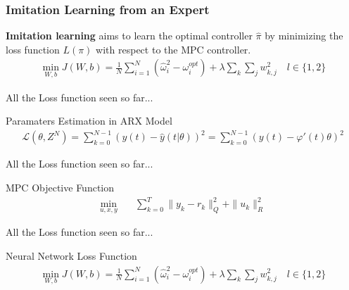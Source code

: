 \documentclass[aspectratio=169,hyperref={pdfpagelabels=false}]{beamer}
\begin{document}
          \begin{frame}
            \frametitle{Imitation Learning from an Expert}
            \begin{block}{}
              \textbf{Imitation learning} aims to learn the optimal controller ${\hat{\pi}}$ by minimizing the loss function $L(\pi)$ with respect to the MPC controller. 
              \begin{align*}
                \min_{W,b} J(W, b) = \frac{1}{N} \sum_{i=1}^{N} (\hat{\omega}_{i}^2 -\omega_{i}^{opt}) + \lambda \sum_{k} \sum_{j} w_{k,j}^2 \quad l \in \{1, 2\}
              \end{align*}
            \end{block}
            \let\thefootnote\relax{}
            \end{frame}

          \begin{frame}{All the Loss function seen so far...}
            \begin{block}{Paramaters Estimation in ARX Model}
              \begin{align*}
                \mathcal{L}(\theta, Z^N) = \sum_{k=0}^{N-1}(y(t)-\hat{y}(t|\theta))^2 = \sum_{k=0}^{N-1}(y(t)-\varphi'(t)\theta)^2 
              \end{align*}
            \end{block}
          \end{frame}

          \begin{frame}{All the Loss function seen so far...}
            \begin{block}{MPC Objective Function}
                \begin{align*}
                \min_{u, x, y} \quad & \sum_{k=0}^{T} \|y_{k} - r_{k}\|^2_Q + \|u_{k}\|^2_R
                \end{align*}
            \end{block}
          \end{frame}

          \begin{frame}{All the Loss function seen so far...}
            \begin{block}{Neural Network Loss Function}
              \begin{align*}
                \min_{W,b} J(W, b) = \frac{1}{N} \sum_{i=1}^{N} (\hat{\omega}_{i}^2 -\omega_{i}^{opt}) + \lambda \sum_{k} \sum_{j} w_{k,j}^2 \quad l \in \{1, 2\}
              \end{align*}
            \end{block}
          \end{frame}
\end{document}
